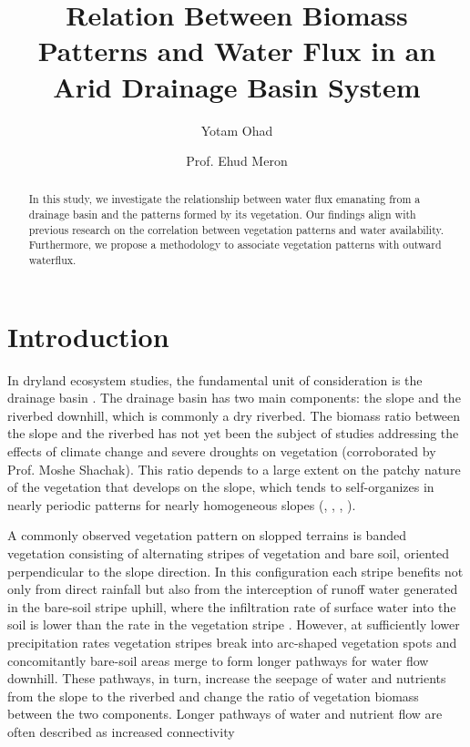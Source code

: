 \documentclass{article}
\title{Relation Between Biomass Patterns and Water Flux in an Arid Drainage Basin System}
\author{Yotam Ohad \and Prof. Ehud Meron}
\numberwithin{equation}{section}
\begin{document}
\maketitle

\begin{abstract}
    In this study, we investigate the relationship between water flux emanating from a drainage basin and the patterns formed by its vegetation. Our findings align with previous research \parencite[]{meron_vegetation_2004} on the correlation between vegetation patterns and water availability. Furthermore, we propose a methodology to associate vegetation patterns with outward waterflux.
\end{abstract}

\section{Introduction}
In dryland ecosystem studies, the fundamental unit of consideration is the drainage basin \parencite{yair_case_1982}.
The drainage basin has two main components: the slope and the riverbed downhill, which is commonly a dry riverbed. The biomass ratio between the slope and the riverbed has not yet been the subject of studies addressing the effects of climate change and severe droughts on vegetation (corroborated by Prof. Moshe Shachak). This ratio depends to a large extent on the patchy nature of the vegetation that develops on the slope, which tends to self-organizes in nearly periodic patterns for nearly homogeneous slopes (\cite{lefever_origin_1997}, \cite{valentin_soil_1999}, \cite{klausmeier_regular_1999}, \cite{von_hardenberg_diversity_2001}).

A commonly observed vegetation pattern on slopped terrains is banded vegetation consisting of alternating stripes of vegetation and bare soil, oriented perpendicular to the slope direction. In this configuration each stripe benefits not only from direct rainfall but also from the interception of runoff water generated in the bare-soil stripe uphill, where the infiltration rate of surface water into the soil is lower than the rate in the vegetation stripe \parencite{meron_vegetation_2019}. However, at sufficiently lower precipitation rates vegetation stripes break into arc-shaped vegetation spots and concomitantly bare-soil areas merge to form longer pathways for water flow downhill. These pathways, in turn, increase the seepage of water and nutrients from the slope to the riverbed and change the ratio of vegetation biomass between the two components. Longer pathways of water and nutrient flow are often described as increased connectivity \parencite{okin_connectivity_2015}
\end{document}
